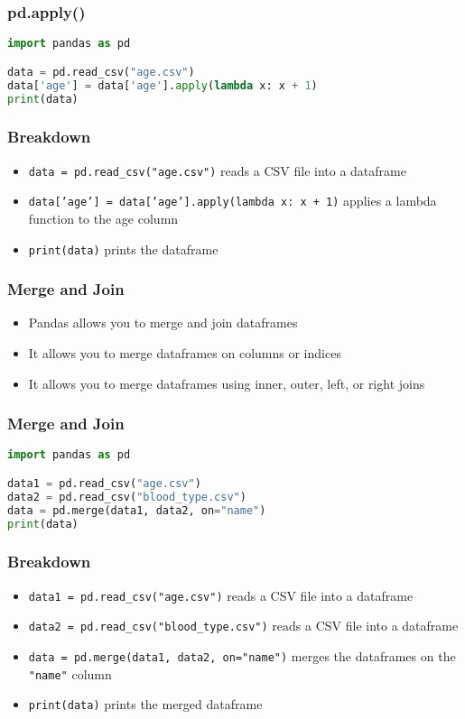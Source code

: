 \documentclass[serif, 9pt, aspectratio=32]{beamer}
\begin{document}
\begin{frame}[fragile]
    \frametitle{pd.apply()}
    \begin{lstlisting}[language=Python]
import pandas as pd

data = pd.read_csv("age.csv")
data['age'] = data['age'].apply(lambda x: x + 1)
print(data)
    \end{lstlisting}
\end{frame}

\begin{frame}
    \centering
    \frametitle{Breakdown}
    \begin{itemize}
        \setlength{\itemsep}{2em}
        \item \texttt{data = pd.read\_csv("age.csv")} reads a CSV file into a dataframe
        \item \texttt{data['age'] = data['age'].apply(lambda x: x + 1)} applies a lambda function to the age column
        \item \texttt{print(data)} prints the dataframe
    \end{itemize}
\end{frame}

\begin{frame}
    \centering
    \frametitle{Merge and Join}
    \begin{itemize}
        \setlength{\itemsep}{2em}
        \item Pandas allows you to merge and join dataframes
        \item It allows you to merge dataframes on columns or indices
        \item It allows you to merge dataframes using inner, outer, left, or right joins
    \end{itemize}
\end{frame}

\begin{frame}[fragile]
    \frametitle{Merge and Join}
    \begin{lstlisting}[language=Python]
import pandas as pd

data1 = pd.read_csv("age.csv")
data2 = pd.read_csv("blood_type.csv")
data = pd.merge(data1, data2, on="name")
print(data)
    \end{lstlisting}
\end{frame}

\begin{frame}
    \centering
    \frametitle{Breakdown}
    \begin{itemize}
        \setlength{\itemsep}{2em}
        \item \texttt{data1 = pd.read\_csv("age.csv")} reads a CSV file into a dataframe
        \item \texttt{data2 = pd.read\_csv("blood\_type.csv")} reads a CSV file into a dataframe
        \item \texttt{data = pd.merge(data1, data2, on="name")} merges the dataframes on the \texttt{"name"} column
        \item \texttt{print(data)} prints the merged dataframe
    \end{itemize}
\end{frame}
\end{document}
